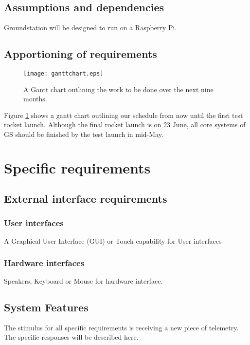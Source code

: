 \documentclass[10pt,journal,draftclsnofoot,onecolumn]{IEEEtran}
\begin{document}
	\subsection{Assumptions and dependencies}
	Groundstation will be designed to run on a Raspberry Pi.
	
	\subsection{Apportioning of requirements}
	
	\begin{figure}
		\texttt{[image: ganttchart.eps]}
		\caption{A Gantt chart outlining the work to be done over the next nine months.}
		\label{fig:gantt}
	\end{figure}
	
	Figure \ref{fig:gantt} shows a gantt chart outlining our schedule from now until the first test rocket launch.
	Although the final rocket launch is on 23 June, all core systems of GS should be finished by the test launch in mid-May.
		
	\section{Specific requirements}
	
	\subsection{External interface requirements}
	\subsubsection{User interfaces}
	A Graphical User Interface (GUI) or Touch capability for User interfaces
	\subsubsection{Hardware interfaces}
	Speakers, Keyboard or Mouse for hardware interface.
	
	\subsection{System Features}
	
	The stimulus for all specific requirements is receiving a new piece of telemetry. The specific responses will be described here.
		
\end{document}
